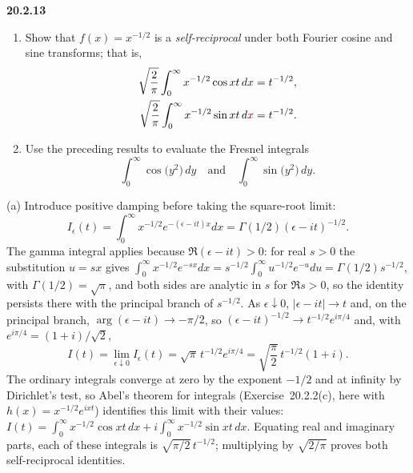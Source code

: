\par\bigskip
\noindent\textbf{20.2.13}
\begin{enumerate}
\item[(a)] Show that $f(x)=x^{-1/2}$ is a \emph{self-reciprocal}
under both Fourier cosine and sine transforms; that is,
\begin{align*}
\sqrt{\frac{2}{\pi}}\int_{0}^{\infty}
x^{-1/2}\cos xt\,dx&=t^{-1/2},\\
\sqrt{\frac{2}{\pi}}\int_{0}^{\infty}
x^{-1/2}\sin xt\,d\erratum{x}&=t^{-1/2}.
\end{align*}
\item[(b)] Use the preceding results to evaluate the Fresnel
integrals
\[
\int_{0}^{\infty}\cos\big(y^{2}\big)\,dy
\quad\text{and}\quad
\int_{0}^{\infty}\sin\big(y^{2}\big)\,dy.
\]
\end{enumerate}
\par{}
\solution
{}
(a) Introduce positive damping before taking the square-root limit:
\[
I_\epsilon(t)=\int_0^\infty x^{-1/2}e^{-(\epsilon-it)x}dx
=\Gamma(1/2)(\epsilon-it)^{-1/2}.
\]
The gamma integral applies because $\Re(\epsilon-it)>0$: for real
$s>0$ the substitution $u=sx$ gives
$\int_0^\infty x^{-1/2}e^{-sx}dx=s^{-1/2}\int_0^\infty u^{-1/2}e^{-u}du
=\Gamma(1/2)s^{-1/2}$, with $\Gamma(1/2)=\sqrt\pi$, and both sides
are analytic in $s$ for $\Re s>0$, so the identity persists there
with the principal branch of $s^{-1/2}$.
As $\epsilon\downarrow0$, $|\epsilon-it|\to t$ and, on the principal
branch, $\arg(\epsilon-it)\to-\pi/2$, so
$(\epsilon-it)^{-1/2}\to t^{-1/2}e^{i\pi/4}$ and, with
$e^{i\pi/4}=(1+i)/\sqrt2$,
\[
I(t)=\lim_{\epsilon\downarrow0}I_\epsilon(t)
=\sqrt\pi\,t^{-1/2}e^{i\pi/4}
=\sqrt{\frac\pi2}\,t^{-1/2}(1+i).
\]
The ordinary integrals converge at zero by the exponent $-1/2$
and at infinity by Dirichlet's test, so Abel's theorem for integrals
(Exercise~20.2.2(c), here with $h(x)=x^{-1/2}e^{ixt}$) identifies
this limit with their values:
$I(t)=\int_0^\infty x^{-1/2}\cos xt\,dx+i\int_0^\infty x^{-1/2}\sin xt\,dx$.
Equating real and imaginary parts, each of these integrals is
$\sqrt{\pi/2}\,t^{-1/2}$; multiplying by $\sqrt{2/\pi}$ proves both
self-reciprocal identities.

